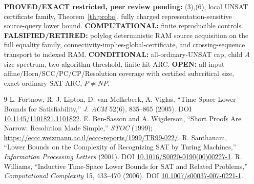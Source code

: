 \documentclass[11pt]{article}
\begin{document}
\textbf{PROVED/EXACT restricted, peer review pending:} (3),(6), local UNSAT certificate family, Theorem~\ref{th:probe}, fully charged representation-sensitive source-query lower bound. \textbf{COMPUTATIONAL:} finite reproducible controls. \textbf{FALSIFIED/RETIRED:} polylog deterministic RAM source acquisition on the full equality family, connectivity-implies-global-certificate, and crossing-sequence transport to indexed RAM. \textbf{CONDITIONAL:} all-ordinary-UNSAT cap, child $A$ size spectrum, two-algorithm threshold, finite-hit ARC. \textbf{OPEN:} all-input affine/Horn/SCC/PC/CP/Resolution coverage with certified subcritical size, exact ordinary SAT ARC, $P\ne NP$.

\begin{thebibliography}{9}
 L. Fortnow, R. J. Lipton, D. van Melkebeek, A. Viglas, ``Time-Space Lower Bounds for Satisfiability,'' \emph{J. ACM} 52(6), 835--865 (2005). DOI \href{https://doi.org/10.1145/1101821.1101822}{10.1145/1101821.1101822}.
 E. Ben-Sasson and A. Wigderson, ``Short Proofs Are Narrow: Resolution Made Simple,'' \emph{STOC} (1999); \url{https://eccc.weizmann.ac.il/eccc-reports/1999/TR99-022/}.
 R. Santhanam, ``Lower Bounds on the Complexity of Recognizing SAT by Turing Machines,'' \emph{Information Processing Letters} (2001). DOI \href{https://doi.org/10.1016/S0020-0190(00)00227-1}{10.1016/S0020-0190(00)00227-1}.
 R. Williams, ``Inductive Time-Space Lower Bounds for SAT and Related Problems,'' \emph{Computational Complexity} 15, 433--470 (2006). DOI \href{https://doi.org/10.1007/s00037-007-0221-1}{10.1007/s00037-007-0221-1}.
\end{thebibliography}
\end{document}
